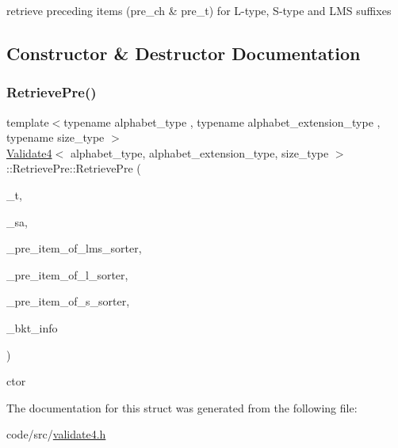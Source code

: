 retrieve preceding items (pre\+\_\+ch \& pre\+\_\+t) for L-\/type, S-\/type and L\+MS suffixes 

\subsection{Constructor \& Destructor Documentation}
\mbox{\label{struct_validate4_1_1_retrieve_pre_abd6dc10b410baedef42cc2261ca8f143}} 
\subsubsection{\texorpdfstring{Retrieve\+Pre()}{RetrievePre()}}
{\footnotesize\ttfamily template$<$typename alphabet\+\_\+type , typename alphabet\+\_\+extension\+\_\+type , typename size\+\_\+type $>$ \\
\hyperlink{class_validate4}{Validate4}$<$ alphabet\+\_\+type, alphabet\+\_\+extension\+\_\+type, size\+\_\+type $>$\+::Retrieve\+Pre\+::\+Retrieve\+Pre (\begin{DoxyParamCaption}\item[{\hyperlink{class_validate4_a49c80b3d101be19542a4341c2387603a}{alphabet\+\_\+vector\+\_\+type} $\ast$}]{\+\_\+t,  }\item[{\hyperlink{class_validate4_a46ea31a0a4b23f583806792160421d15}{size\+\_\+vector\+\_\+type} $\ast$}]{\+\_\+sa,  }\item[{\hyperlink{class_validate4_aff3135d55f749682df7e0f97c82a6769}{pair3\+\_\+less\+\_\+sorter\+\_\+1st\+\_\+type} $\ast$\&}]{\+\_\+pre\+\_\+item\+\_\+of\+\_\+lms\+\_\+sorter,  }\item[{\hyperlink{class_validate4_a4c1bcea817e34f96d95c99e0694bbfc8}{triple2\+\_\+less\+\_\+sorter\+\_\+1st\+\_\+type} $\ast$\&}]{\+\_\+pre\+\_\+item\+\_\+of\+\_\+l\+\_\+sorter,  }\item[{\hyperlink{class_validate4_aa35a0ebf404821377118043d536be262}{triple2\+\_\+great\+\_\+sorter\+\_\+1st\+\_\+type} $\ast$\&}]{\+\_\+pre\+\_\+item\+\_\+of\+\_\+s\+\_\+sorter,  }\item[{\hyperlink{struct_validate4_1_1_bkt_info}{Bkt\+Info} \&}]{\+\_\+bkt\+\_\+info }\end{DoxyParamCaption})\hspace{0.3cm}{\ttfamily [inline]}}



ctor 



The documentation for this struct was generated from the following file\+:\begin{DoxyCompactItemize}
\item 
code/src/\hyperlink{validate4_8h}{validate4.\+h}\end{DoxyCompactItemize}
